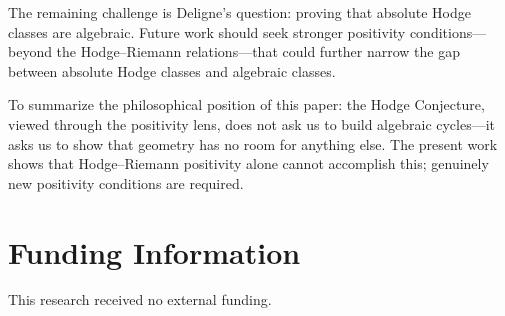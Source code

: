 \documentclass[aps,prd,twocolumn,superscriptaddress,nofootinbib]{revtex4-2}
\theoremstyle{definition}
\theoremstyle{remark}
\begin{document}
The remaining challenge is Deligne's question: proving that absolute Hodge classes are algebraic. Future work should seek stronger positivity conditions---beyond the Hodge--Riemann relations---that could further narrow the gap between absolute Hodge classes and algebraic classes.

To summarize the philosophical position of this paper: the Hodge Conjecture, viewed through the positivity lens, does not ask us to build algebraic cycles---it asks us to show that geometry has no room for anything else. The present work shows that Hodge--Riemann positivity alone cannot accomplish this; genuinely new positivity conditions are required.


\section*{Funding Information}
This research received no external funding.
\end{document}
